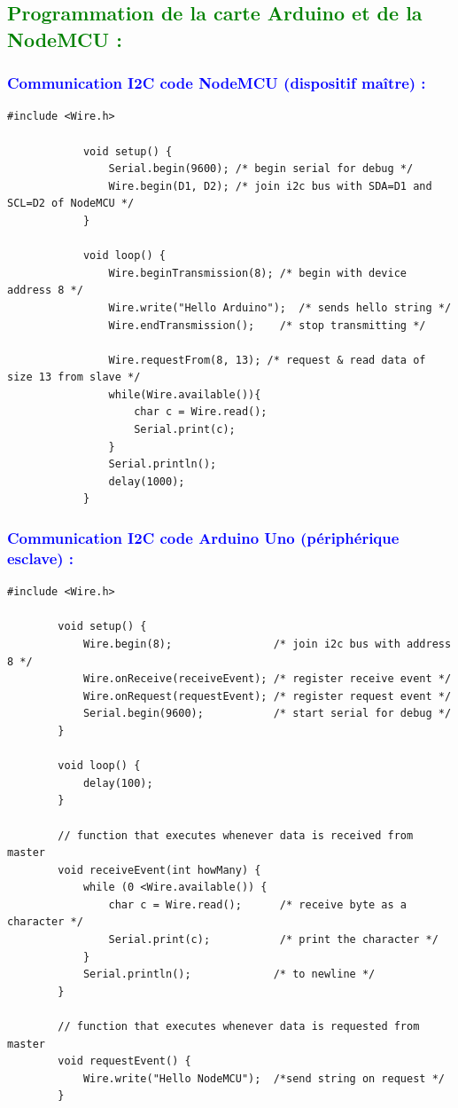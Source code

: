 \begin{flushleft}
	\subsection{\textcolor{green}{Programmation de la carte Arduino et de la NodeMCU :}}
		\subsubsection{\textcolor{blue}{Communication I2C code NodeMCU (dispositif maître) :}}
		\begin{lstlisting}[style=CStyle]
			#include <Wire.h>
			
			void setup() {
				Serial.begin(9600); /* begin serial for debug */
				Wire.begin(D1, D2); /* join i2c bus with SDA=D1 and SCL=D2 of NodeMCU */
			}
			
			void loop() {
				Wire.beginTransmission(8); /* begin with device address 8 */
				Wire.write("Hello Arduino");  /* sends hello string */
				Wire.endTransmission();    /* stop transmitting */
				
				Wire.requestFrom(8, 13); /* request & read data of size 13 from slave */
				while(Wire.available()){
					char c = Wire.read();
					Serial.print(c);
				}
				Serial.println();
				delay(1000);
			}
		\end{lstlisting}
	
	\subsubsection{\textcolor{blue}{Communication I2C code Arduino Uno (périphérique esclave) :}}
	\begin{lstlisting}[style=CStyle]
		#include <Wire.h>
		
		void setup() {
			Wire.begin(8);                /* join i2c bus with address 8 */
			Wire.onReceive(receiveEvent); /* register receive event */
			Wire.onRequest(requestEvent); /* register request event */
			Serial.begin(9600);           /* start serial for debug */
		}
		
		void loop() {
			delay(100);
		}
		
		// function that executes whenever data is received from master
		void receiveEvent(int howMany) {
			while (0 <Wire.available()) {
				char c = Wire.read();      /* receive byte as a character */
				Serial.print(c);           /* print the character */
			}
			Serial.println();             /* to newline */
		}
		
		// function that executes whenever data is requested from master
		void requestEvent() {
			Wire.write("Hello NodeMCU");  /*send string on request */
		}
	\end{lstlisting}
			

\end{flushleft}
